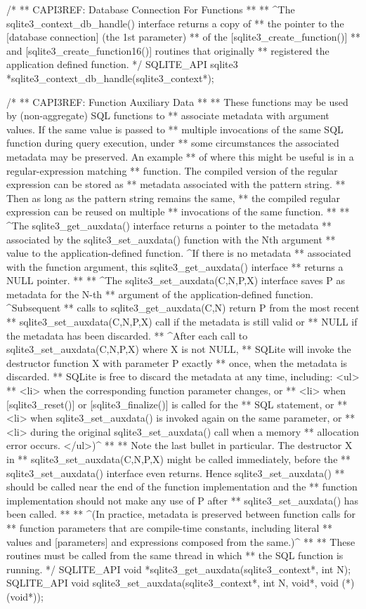 \begin{Codex}[label=sqlite3.h,numbers=left]
{/*
** CAPI3REF: Database Connection For Functions
**
** ^The sqlite3_context_db_handle() interface returns a copy of
** the pointer to the [database connection] (the 1st parameter)
** of the [sqlite3_create_function()]
** and [sqlite3_create_function16()] routines that originally
** registered the application defined function.
*/
SQLITE_API sqlite3 *sqlite3_context_db_handle(sqlite3_context*);

/*
** CAPI3REF: Function Auxiliary Data
**
** These functions may be used by (non-aggregate) SQL functions to
** associate metadata with argument values. If the same value is passed to
** multiple invocations of the same SQL function during query execution, under
** some circumstances the associated metadata may be preserved.  An example
** of where this might be useful is in a regular-expression matching
** function. The compiled version of the regular expression can be stored as
** metadata associated with the pattern string.  
** Then as long as the pattern string remains the same,
** the compiled regular expression can be reused on multiple
** invocations of the same function.
**
** ^The sqlite3_get_auxdata() interface returns a pointer to the metadata
** associated by the sqlite3_set_auxdata() function with the Nth argument
** value to the application-defined function. ^If there is no metadata
** associated with the function argument, this sqlite3_get_auxdata() interface
** returns a NULL pointer.
**
** ^The sqlite3_set_auxdata(C,N,P,X) interface saves P as metadata for the N-th
** argument of the application-defined function.  ^Subsequent
** calls to sqlite3_get_auxdata(C,N) return P from the most recent
** sqlite3_set_auxdata(C,N,P,X) call if the metadata is still valid or
** NULL if the metadata has been discarded.
** ^After each call to sqlite3_set_auxdata(C,N,P,X) where X is not NULL,
** SQLite will invoke the destructor function X with parameter P exactly
** once, when the metadata is discarded.
** SQLite is free to discard the metadata at any time, including: <ul>
** <li> when the corresponding function parameter changes, or
** <li> when [sqlite3_reset()] or [sqlite3_finalize()] is called for the
**      SQL statement, or
** <li> when sqlite3_set_auxdata() is invoked again on the same parameter, or
** <li> during the original sqlite3_set_auxdata() call when a memory 
**      allocation error occurs. </ul>)^
**
** Note the last bullet in particular.  The destructor X in 
** sqlite3_set_auxdata(C,N,P,X) might be called immediately, before the
** sqlite3_set_auxdata() interface even returns.  Hence sqlite3_set_auxdata()
** should be called near the end of the function implementation and the
** function implementation should not make any use of P after
** sqlite3_set_auxdata() has been called.
**
** ^(In practice, metadata is preserved between function calls for
** function parameters that are compile-time constants, including literal
** values and [parameters] and expressions composed from the same.)^
**
** These routines must be called from the same thread in which
** the SQL function is running.
*/
SQLITE_API void *sqlite3_get_auxdata(sqlite3_context*, int N);
SQLITE_API void sqlite3_set_auxdata(sqlite3_context*, int N, void*, void (*)(void*));


}
\end{Codex}
